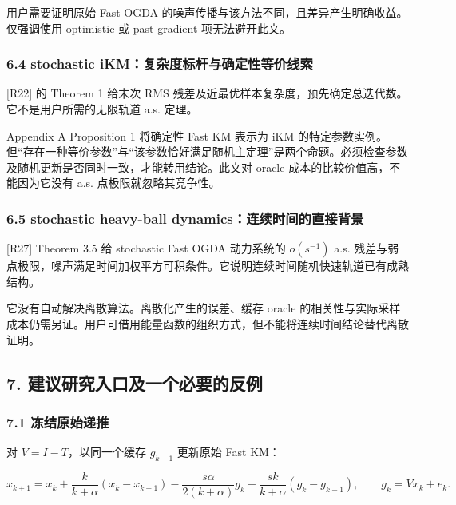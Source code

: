 \documentclass[
  chinese,
  10pt,
  a4paper,
]{article}
\begin{document}
用户需要证明原始 Fast OGDA
的噪声传播与该方法不同，且差异产生明确收益。仅强调使用 optimistic 或
past-gradient 项无法避开此文。

\subsubsection{6.4 stochastic
iKM：复杂度标杆与确定性等价线索}\label{stochastic-ikmux590dux6742ux5ea6ux6807ux6746ux4e0eux786eux5b9aux6027ux7b49ux4ef7ux7ebfux7d22}

{[}R22{]} 的 Theorem 1 给末次 RMS
残差及近最优样本复杂度，预先确定总迭代数。它不是用户所需的无限轨道 a.s.
定理。

Appendix A Proposition 1 将确定性 Fast KM 表示为 iKM
的特定参数实例。但``存在一种等价参数''与``该参数恰好满足随机主定理''是两个命题。必须检查参数及随机更新是否同时一致，才能转用结论。此文对
oracle 成本的比较价值高，不能因为它没有 a.s. 点极限就忽略其竞争性。

\subsubsection{6.5 stochastic heavy-ball
dynamics：连续时间的直接背景}\label{stochastic-heavy-ball-dynamicsux8fdeux7eedux65f6ux95f4ux7684ux76f4ux63a5ux80ccux666f}

{[}R27{]} Theorem 3.5 给 stochastic Fast OGDA 动力系统的 \(o(s^{-1})\)
a.s.
残差与弱点极限，噪声满足时间加权平方可积条件。它说明连续时间随机快速轨道已有成熟结构。

它没有自动解决离散算法。离散化产生的误差、缓存 oracle
的相关性与实际采样成本仍需另证。用户可借用能量函数的组织方式，但不能将连续时间结论替代离散证明。

\subsection{7.
建议研究入口及一个必要的反例}\label{ux5efaux8baeux7814ux7a76ux5165ux53e3ux53caux4e00ux4e2aux5fc5ux8981ux7684ux53cdux4f8b}

\subsubsection{7.1
冻结原始递推}\label{ux51bbux7ed3ux539fux59cbux9012ux63a8}

对 \(V=I-T\)，以同一个缓存 \(g_{k-1}\) 更新原始 Fast KM：

\[
x_{k+1}=x_k+\frac{k}{k+\alpha}(x_k-x_{k-1})-\frac{s\alpha}{2(k+\alpha)}g_k-\frac{sk}{k+\alpha}(g_k-g_{k-1}),\qquad g_k=Vx_k+e_k.
\]
\end{document}
